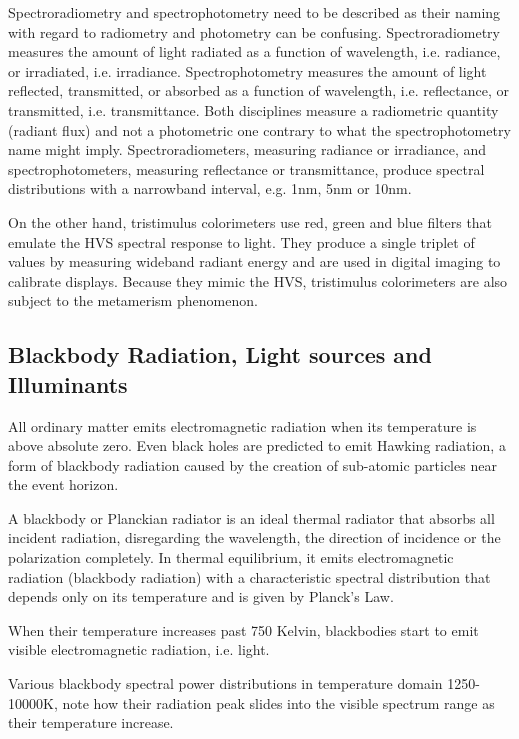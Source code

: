 Spectroradiometry and spectrophotometry need to be described as their naming with regard to radiometry and photometry can be confusing.
Spectroradiometry measures the amount of light radiated as a function of wavelength, i.e. radiance, or irradiated, i.e. irradiance.
Spectrophotometry measures the amount of light reflected, transmitted, or absorbed as a function of wavelength, i.e. reflectance, or transmitted, i.e. transmittance.
Both disciplines measure a radiometric quantity (radiant flux) and not a photometric one contrary to what the spectrophotometry name might imply. Spectroradiometers, measuring radiance or irradiance, and spectrophotometers, measuring reflectance or transmittance, produce spectral distributions with a narrowband interval, e.g. 1nm, 5nm or 10nm.

On the other hand, tristimulus colorimeters use red, green and blue filters that emulate the HVS spectral response to light. They produce a single triplet of values by measuring wideband radiant energy and are used in digital imaging to calibrate displays. Because they mimic the HVS, tristimulus colorimeters are also subject to the metamerism phenomenon.

\subsection{Blackbody Radiation, Light sources and Illuminants}%
\label{subsec:blackbody-radiation-light-sources-and-illuminants}

All ordinary matter emits electromagnetic radiation when its temperature is above absolute zero. Even black holes are predicted to emit Hawking radiation, a form of blackbody radiation caused by the creation of sub-atomic particles near the event horizon.

A blackbody or Planckian radiator is an ideal thermal radiator that absorbs all incident radiation, disregarding the wavelength, the direction of incidence or the polarization completely. In thermal equilibrium, it emits electromagnetic radiation (blackbody radiation) with a characteristic spectral distribution that depends only on its temperature and is given by Planck's Law.



When their temperature increases past 750 Kelvin, blackbodies start to emit visible electromagnetic radiation, i.e. light.

Various blackbody spectral power distributions in temperature domain 1250-10000K, note how their radiation peak slides into the visible spectrum range as their temperature increase.

